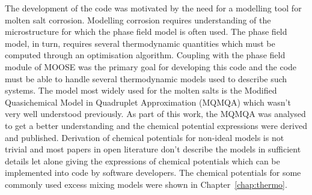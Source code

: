 	The development of the code was motivated by the need for a modelling tool for molten salt corrosion. Modelling corrosion requires understanding of the microstructure for which the phase field model is often used. The phase field model, in turn, requires several thermodynamic quantities which must be computed through an optimisation algorithm. Coupling with the phase field module of MOOSE was the primary goal for developing this code and the code must be able to handle several thermodynamic models used to describe such systems. The model most widely used for the molten salts is the Modified Quasichemical Model in Quadruplet Approximation (MQMQA) which wasn't very well understood previously. As part of this work, the MQMQA was analysed to get a better understanding and the chemical potential expressions were derived and published. Derivation of chemical potentials for non-ideal models is not trivial and most papers in open literature don't describe the models in sufficient details let alone giving the expressions of chemical potentials which can be implemented into code by software developers. The chemical potentials for some commonly used excess mixing models were shown in Chapter~\ref{chap:thermo}.
	
